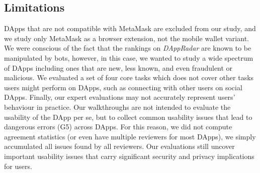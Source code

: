 \documentclass[conference]{IEEEtran}
\begin{document}


\subsection{Limitations}
DApps that are not compatible with MetaMask are excluded from our study, and we study only MetaMask as a browser extension, not the mobile wallet variant. 
We were conscious of the fact that the rankings on \textit{DAppRadar} are known to be manipulated by bots, however, in this case, we wanted to study a wide spectrum of DApps including ones that are new, less known, and even fraudulent or malicious. 
We evaluated a set of four core tasks which does not cover other tasks users might perform on DApps, such as connecting with other users on social DApps.
Finally, our expert evaluations may not accurately represent users' behaviour in practice. %
Our walkthroughs are not intended to evaluate the usability of the DApp per se, but to collect common usability issues that lead to dangerous errors (G5) across DApps. For this reason, we did not compute agreement statistics (or even have multiple reviewers for most DApps), we simply accumulated all issues found by all reviewers.
Our evaluations still uncover important usability issues that carry significant security and privacy implications for users.


\end{document}
